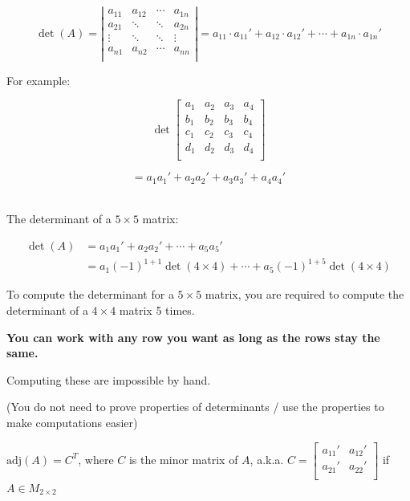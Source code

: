 \documentclass[
]{article}
\newcounter{example}
\begin{document}
$$\det(A) = \left| \begin{matrix}
a_{11} & a_{12} & \cdots & a_{1n} \\
a_{21} & \ddots & \ddots & a_{2n} \\
 \vdots & \ddots & \ddots & \vdots \\
a_{n1} & a_{n2} & \cdots & a_{nn} \\
\end{matrix} \right| = a_{11} \cdot a_{11}' + a_{12} \cdot a_{12}' + \cdots + a_{1n} \cdot a_{1n}'$$

For example:

$$\det\begin{bmatrix}
a_{1} & a_{2} & a_{3} & a_{4} \\
b_{1} & b_{2} & b_{3} & b_{4} \\
c_{1} & c_{2} & c_{3} & c_{4} \\
d_{1} & d_{2} & d_{3} & d_{4} \\
\end{bmatrix}$$

$$= a_{1}a_{1}' + a_{2}a_{2}' + a_{3}a_{3}' + a_{4}a_{4}'$$

\begin{align*}
&
\end{align*}


The determinant of a $5 \times 5$ matrix:

\begin{align*}
\det(A) &= a_{1}a_{1}' + a_{2}a_{2}' + \cdots + a_{5}a_{5}'
 \\
&= a_{1}( - 1)^{1 + 1}\det(4 \times 4) + \cdots + a_{5}( - 1)^{1 + 5}\det(4 \times 4)
\end{align*}


To compute the determinant for a $5 \times 5$ matrix, you are required
to compute the determinant of a $4 \times 4$ matrix 5 times.

\textbf{You can work with any row you want as long as the rows stay the
same.}

Computing these are impossible by hand.

(You do not need to prove properties of determinants / use the
properties to make computations easier)

$\text{adj}(A) = C^{T}$, where $C$ is the minor matrix of $A$,
a.k.a. $C = \begin{bmatrix}
a_{11}' & a_{12}' \\
a_{21}' & a_{22}' \\
\end{bmatrix}$ if $A \in M_{2 \times 2}$
\end{document}

